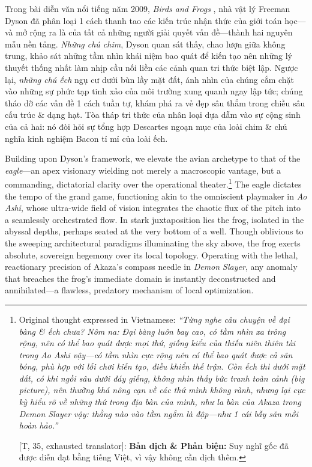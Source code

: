 \documentclass{article}
\begin{document}
Trong bài diễn văn nổi tiếng năm 2009, \textit{Birds and Frogs} \cite{dyson2009birds}, nhà vật lý Freeman Dyson đã phân loại 1 cách thanh tao các kiến trúc nhận thức của giới toán học---và mở rộng ra là của tất cả những người giải quyết vấn đề---thành hai nguyên mẫu nền tảng. \textit{Những chú chim}, Dyson quan sát thấy, chao lượn giữa không trung, khảo sát những tầm nhìn khái niệm bao quát để kiến tạo nên những lý thuyết thống nhất làm nhịp cầu nối liền các cảnh quan tri thức biệt lập. Ngược lại, \textit{những chú ếch} ngụ cư dưới bùn lầy mặt đất, ánh nhìn của chúng cắm chặt vào những sự phức tạp tinh xảo của môi trường xung quanh ngay lập tức; chúng tháo dỡ các vấn đề 1 cách tuần tự, khám phá ra vẻ đẹp sâu thẳm trong chiều sâu cấu trúc \& dạng hạt. Tòa tháp tri thức của nhân loại dựa dẫm vào sự cộng sinh của cả hai: nó đòi hỏi sự tổng hợp Descartes ngoạn mục của loài chim \& chủ nghĩa kinh nghiệm Bacon tỉ mỉ của loài ếch.

Building upon Dyson's framework, we elevate the avian archetype to that of the \textit{eagle}---an apex visionary wielding not merely a macroscopic vantage, but a commanding, dictatorial clarity over the operational theater.\footnote{Original thought expressed in Vietnamese: \textit{``Từng nghe câu chuyện về đại bàng \& ếch chưa? Nôm na: Đại bàng luôn bay cao, có tầm nhìn xa trông rộng, nên có thể bao quát được mọi thứ, giống kiểu của thiếu niên thiên tài trong Ao Ashi vậy---có tầm nhìn cực rộng nên có thể bao quát được cả sân bóng, phù hợp với lối chơi kiến tạo, điều khiển thế trận. Còn ếch thì dưới mặt đất, có khi ngồi sâu dưới đáy giếng, không nhìn thấy bức tranh toàn cảnh (big picture), nên thường khá nông cạn về các thứ mình không rành, nhưng lại cực kỳ hiểu rõ về những thứ trong địa bàn của mình, như la bàn của Akaza trong Demon Slayer vậy: thằng nào vào tầm ngắm là đập---như 1 cái bẫy săn mồi hoàn hảo.''}
	
	\textsf{[T, 35, exhausted translator]:} \textbf{Bản dịch \& Phản biện:} Suy nghĩ gốc đã được diễn đạt bằng tiếng Việt, vì vậy không cần dịch thêm.} The eagle dictates the tempo of the grand game, functioning akin to the omniscient playmaker in \textit{Ao Ashi}, whose ultra-wide field of vision integrates the chaotic flux of the pitch into a seamlessly orchestrated flow. In stark juxtaposition lies the frog, isolated in the abyssal depths, perhaps seated at the very bottom of a well. Though oblivious to the sweeping architectural paradigms illuminating the sky above, the frog exerts absolute, sovereign hegemony over its local topology. Operating with the lethal, reactionary precision of Akaza's compass needle in \textit{Demon Slayer}, any anomaly that breaches the frog's immediate domain is instantly deconstructed and annihilated---a flawless, predatory mechanism of local optimization.
\end{document}
